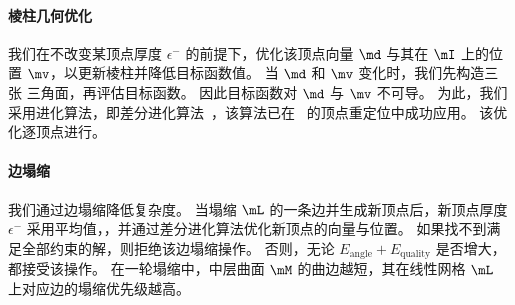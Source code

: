 %
%

\paragraph{棱柱几何优化}
我们在不改变某顶点厚度 $\epsilon^{-}$ 的前提下，优化该顶点向量 $\md$ 与其在 $\mI$ 上的位置 $\mv$，以更新棱柱并降低目标函数值。
%
当 $\md$ 和 $\mv$ 变化时，我们先构造三张 \Bezier 三角面，再评估目标函数。
%
因此目标函数对 $\md$ 与 $\mv$ 不可导。
为此，我们采用进化算法，即差分进化算法~\cite{Neri2010advance,Das2011Differential}，该算法已在~\cite{Zhang2022ConstrainedRU} 的顶点重定位中成功应用。
%
该优化逐顶点进行。

\paragraph{边塌缩}
我们通过边塌缩降低复杂度。
%
当塌缩 $\mL$ 的一条边并生成新顶点后，新顶点厚度 $\epsilon^{-}$ 采用平均值，，并通过差分进化算法优化新顶点的向量与位置。
%
如果找不到满足全部约束的解，则拒绝该边塌缩操作。
否则，无论 $E_{\text{angle}} + E_{\text{quality}}$ 是否增大，都接受该操作。
在一轮塌缩中，中层曲面 $\mM$ 的曲边越短，其在线性网格 $\mL$ 上对应边的塌缩优先级越高。

